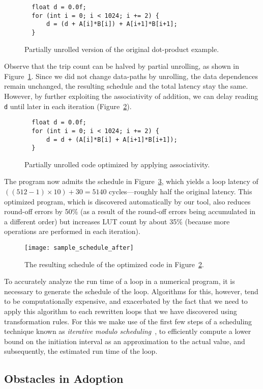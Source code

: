 \begin{figure}[ht]
\begin{lstlisting}
  float d = 0.0f;
  for (int i = 0; i < 1024; i += 2) {
      d = (d + A[i]*B[i]) + A[i+1]*B[i+1];
  }
\end{lstlisting}
    \caption{Partially unrolled version of the original dot-product example.}
    \label{bg:fig:dotprod_unroll}
\end{figure}
Observe that the trip count can be halved by partial unrolling, as shown in
Figure~\ref{bg:fig:dotprod_unroll}.  Since we did not change data-paths by
unrolling, the data dependences remain unchanged, the resulting schedule
and the total latency stay the same.  However, by further exploiting the
associativity of addition, we can delay reading \verb|d| until later in each
iteration (Figure~\ref{bg:fig:dotprod_optimized}).
\begin{figure}[ht]
\begin{lstlisting}
  float d = 0.0f;
  for (int i = 0; i < 1024; i += 2) {
      d = d + (A[i]*B[i] + A[i+1]*B[i+1]);
  }
\end{lstlisting}
    \caption{Partially unrolled code optimized by applying associativity.}
    \label{bg:fig:dotprod_optimized}
\end{figure}

The program now admits the schedule in
Figure~\ref{bg:fig:sample_schedule_after}, which yields a loop latency
of $((512-1)\times 10) + 30 = 5140$ cycles---roughly half the original
latency. This optimized program, which is discovered automatically by our tool,
also reduces round-off errors by 50\% (as a result of the round-off errors
being accumulated in a different order) but increases LUT count by about 35\%
(because more operations are performed in each iteration).

\begin{figure}[ht]
    \centering
    \texttt{[image: sample\_schedule\_after]}
    \caption{%
        The resulting schedule of the optimized code in
        Figure~\ref{bg:fig:dotprod_optimized}.}
    \label{bg:fig:sample_schedule_after}
\end{figure}

To accurately analyze the run time of a loop in a numerical program, it is
necessary to generate the schedule of the loop.  Algorithms for this, however,
tend to be computationally expensive, and exacerbated by the fact that we
need to apply this algorithm to each rewritten loops that we have discovered
using transformation rules.  For this we make use of the first few steps of a
scheduling technique known as \emph{iterative modulo scheduling}~\cite{rau94},
to efficiently compute a lower bound on the initiation interval as an
approximation to the actual value, and subsequently, the estimated run time of
the loop.


\subsection{Obstacles in Adoption}
\label{sub:obstacles_in_adoption}


